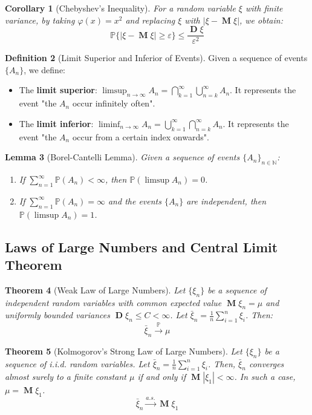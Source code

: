 \documentclass[12pt, openany]{book}
\theoremstyle{definition}
\newtheorem{definition}{Definition}[section]
\theoremstyle{plain}
\newtheorem{theorem}[definition]{Theorem}
\newtheorem{lemma}[definition]{Lemma}
\newtheorem{corollary}[definition]{Corollary}
\theoremstyle{remark}
\newcommand{\N}{\mathbb{N}}
\newcommand{\probP}{\mathbb{P}}
\DeclareMathOperator{\M}{\mathbf{M}} %
\DeclareMathOperator{\D}{\mathbf{D}} %
\begin{document}
\begin{corollary}[Chebyshev's Inequality]
For a random variable $\xi$ with finite variance, by taking $\varphi(x) = x^2$ and replacing $\xi$ with $|\xi - \M\xi|$, we obtain:
$$ \probP\{|\xi - \M\xi| \ge \varepsilon\} \le \frac{\D\xi}{\varepsilon^2} $$
\end{corollary}

\begin{definition}[Limit Superior and Inferior of Events]
Given a sequence of events $\{A_n\}$, we define:
\begin{itemize}
    \item The \textbf{limit superior}: $\limsup_{n \to \infty} A_n = \bigcap_{k=1}^\infty \bigcup_{n=k}^\infty A_n$. It represents the event "the $A_n$ occur infinitely often".
    \item The \textbf{limit inferior}: $\liminf_{n \to \infty} A_n = \bigcup_{k=1}^\infty \bigcap_{n=k}^\infty A_n$. It represents the event "the $A_n$ occur from a certain index onwards".
\end{itemize}
\end{definition}

\begin{lemma}[Borel-Cantelli Lemma]
Given a sequence of events $\{A_n\}_{n \in \N}$:
\begin{enumerate}
    \item If $\sum_{n=1}^\infty \probP(A_n) < \infty$, then $\probP(\limsup A_n) = 0$.
    \item If $\sum_{n=1}^\infty \probP(A_n) = \infty$ and the events $\{A_n\}$ are independent, then $\probP(\limsup A_n) = 1$.
\end{enumerate}
\end{lemma}

\subsection{Laws of Large Numbers and Central Limit Theorem}

\begin{theorem}[Weak Law of Large Numbers]
Let $\{\xi_n\}$ be a sequence of independent random variables with common expected value $\M\xi_n = \mu$ and uniformly bounded variances $\D\xi_n \le C < \infty$. Let $\bar{\xi}_n = \frac{1}{n}\sum_{i=1}^n \xi_i$. Then:
$$ \bar{\xi}_n \xrightarrow{\probP} \mu $$
\end{theorem}

\begin{theorem}[Kolmogorov's Strong Law of Large Numbers]
Let $\{\xi_n\}$ be a sequence of i.i.d. random variables. Let $\bar{\xi}_n = \frac{1}{n}\sum_{i=1}^n \xi_i$. Then, $\bar{\xi}_n$ converges almost surely to a finite constant $\mu$ if and only if $\M|\xi_1| < \infty$. In such a case, $\mu = \M\xi_1$.
$$ \bar{\xi}_n \xrightarrow{a.s.} \M\xi_1 $$
\end{theorem}
\end{document}
